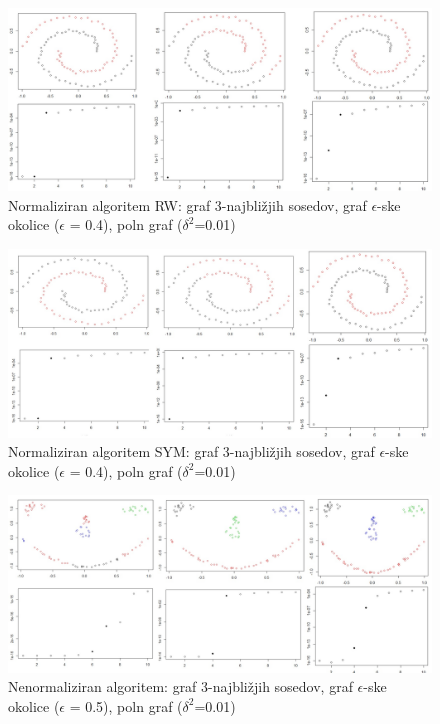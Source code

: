 \documentclass[a4paper, 10pt]{article}
\begin{document}
\begin{figure}[h]
\caption{Normaliziran algoritem RW: graf 3-najbližjih sosedov, graf $\epsilon$-ske okolice ($\epsilon$ = 0.4), poln graf ($\delta^2$=0.01)}
\includegraphics[width=\textwidth]{norm-spiral}
\end{figure}

\begin{figure}[h]
\caption{Normaliziran algoritem SYM: graf 3-najbližjih sosedov, graf $\epsilon$-ske okolice ($\epsilon$ = 0.4), poln graf ($\delta^2$=0.01)}
\includegraphics[width=\textwidth]{norm-spiral-sym}
\end{figure}

\begin{figure}[h]
\caption{Nenormaliziran algoritem: graf 3-najbližjih sosedov, graf $\epsilon$-ske okolice ($\epsilon$ = 0.5), poln graf ($\delta^2$=0.01)}
\includegraphics[width=\textwidth]{unnorm-smiley}
\end{figure}
\end{document}
